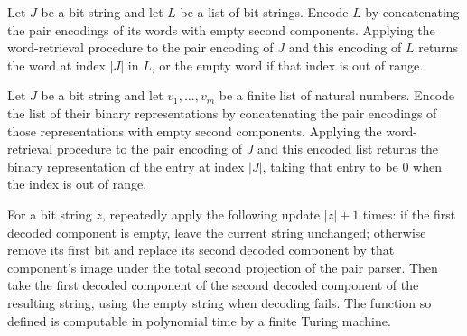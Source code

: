 \begin{theorem}
\label{Complexity.BinArith.getW_pairEncode}
\leanok
{}
Let $J$ be a bit string and let $L$ be a list of bit strings. Encode $L$ by
concatenating the pair encodings of its words with empty second components. Applying the
word-retrieval procedure to the pair encoding of $J$ and this encoding of $L$ returns
the word at index $|J|$ in $L$, or the empty word if that index is out of range.
\end{theorem}

\begin{theorem}
\label{Complexity.BinArith.getW_pairEncode_bits}
\leanok
{}
Let $J$ be a bit string and let $v_1,\ldots,v_m$ be a finite list of natural numbers.
Encode the list of their binary representations by concatenating the pair encodings of
those representations with empty second components. Applying the word-retrieval
procedure to the pair encoding of $J$ and this encoded list returns the binary
representation of the entry at index $|J|$, taking that entry to be $0$ when the index
is out of range.
\end{theorem}

\begin{theorem}
\label{Complexity.BinArith.polyTimeComputable_getW}
\leanok
{}
For a bit string $z$, repeatedly apply the following update $|z|+1$ times: if the first
decoded component is empty, leave the current string unchanged; otherwise remove its
first bit and replace its second decoded component by that component's image under the
total second projection of the pair parser. Then take the first decoded component of the
second decoded component of the resulting string, using the empty string when decoding
fails. The function so defined is computable in polynomial time by a finite Turing
machine.
\end{theorem}

